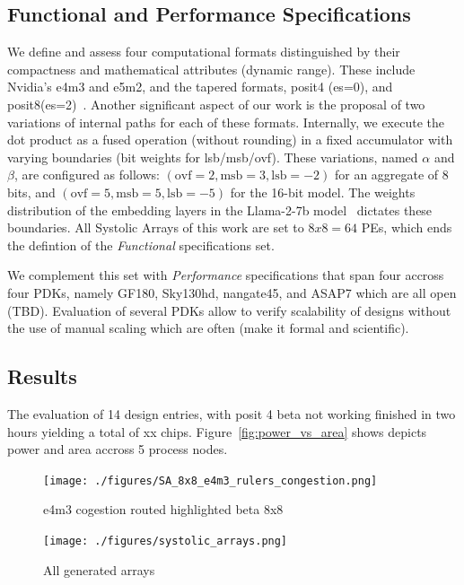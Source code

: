 \subsection{Functional and Performance Specifications}
\label{sec:specifications}
We define and assess four computational formats distinguished by their compactness and mathematical attributes (dynamic range).
These include Nvidia's e4m3 and e5m2, and the tapered formats, posit4 (es=0), and posit8(es=2)~\cite{}.
Another significant aspect of our work is the proposal of two variations of internal paths for each of these formats.
Internally, we execute the dot product as a fused operation (without rounding) in a fixed accumulator with varying boundaries (bit weights for lsb/msb/ovf).
These variations, named $\alpha$ and $\beta$, are configured as follows: $(\text{ovf}=2,\text{msb}=3,\text{lsb}=-2)$ for an aggregate of 8 bits, and $(\text{ovf}=5,\text{msb}=5,\text{lsb}=-5)$ for the 16-bit model.
The weights distribution of the embedding layers in the Llama-2-7b model~\cite{} dictates these boundaries.
All Systolic Arrays of this work are set to $8x8=64$ PEs, which ends the defintion of the \textit{Functional} specifications set.

We complement this set with \textit{Performance} specifications that span four accross four PDKs, namely GF180, Sky130hd, nangate45, and ASAP7 which are all open (TBD).
Evaluation of several PDKs allow to verify scalability of designs without the use of manual scaling which are often (make it formal and scientific).

\subsection{Results}
The evaluation of 14 design entries, with posit 4 beta not working finished in two hours yielding a total of xx chips.
Figure~\ref{fig:power_vs_area} shows depicts power and area accross 5 process nodes.



\begin{figure}[t]
\centering
	\vspace{-0.5cm}
	\texttt{[image: ./figures/SA\_8x8\_e4m3\_rulers\_congestion.png]}
	\vspace{-0.5cm}
	\caption{e4m3 cogestion routed highlighted beta 8x8}
	\label{fig:focus on e4m3}
\end{figure}

\begin{figure}[t]
\centering
	\vspace{-0.5cm}
	\texttt{[image: ./figures/systolic\_arrays.png]}
	\vspace{-0.5cm}
	\caption{All generated arrays}
	\label{fig:all_arrays}
\end{figure}

